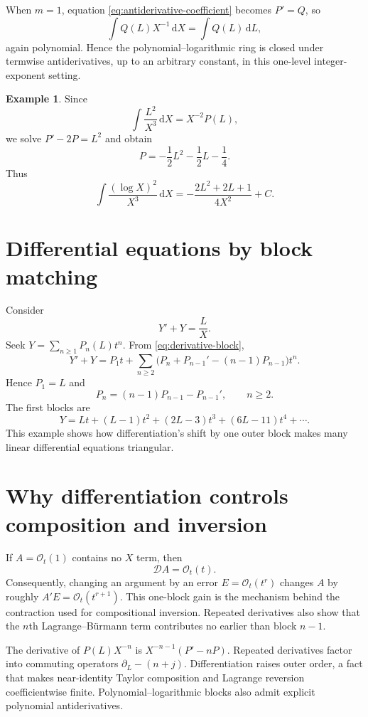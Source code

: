 \documentclass[11pt,oneside]{book}
\theoremstyle{definition}
\newtheorem{example}[theorem]{Example}
\theoremstyle{remark}
\newcommand{\dd}{\,\mathrm d}
\newcommand{\D}{\mathcal D}
\newcommand{\bigO}{\mathcal O}
\begin{document}
When $m=1$, equation \eqref{eq:antiderivative-coefficient} becomes $P'=Q$,
so
\[
 \int Q(L)X^{-1}\dd X=\int Q(L)\dd L,
\]
again polynomial.  Hence the polynomial--logarithmic ring is closed under
termwise antiderivatives, up to an arbitrary constant, in this one-level
integer-exponent setting.

\begin{example}
Since
\[
 \int \frac{L^2}{X^3}\dd X=X^{-2}P(L),
\]
we solve $P'-2P=L^2$ and obtain
\[
 P=-\frac12L^2-\frac12L-\frac14.
\]
Thus
\[
 \int \frac{(\log X)^2}{X^3}\dd X
 =-\frac{2L^2+2L+1}{4X^2}+C.
\]
\end{example}

\section{Differential equations by block matching}
Consider
\begin{equation}\label{eq:simple-ode}
 Y'+Y=\frac{L}{X}.
\end{equation}
Seek $Y=\sum_{n\ge1}P_n(L)t^n$.  From
\eqref{eq:derivative-block},
\[
 Y'+Y=P_1t+\sum_{n\ge2}
 \bigl(P_n+P_{n-1}'-(n-1)P_{n-1}\bigr)t^n.
\]
Hence $P_1=L$ and
\[
 P_n=(n-1)P_{n-1}-P_{n-1}',\qquad n\ge2.
\]
The first blocks are
\[
 Y=Lt+(L-1)t^2+(2L-3)t^3+(6L-11)t^4+\cdots.
\]
This example shows how differentiation's shift by one outer block makes many
linear differential equations triangular.

\section{Why differentiation controls composition and inversion}
If $A=\bigO_t(1)$ contains no $X$ term, then
\begin{equation}\label{eq:A-derivative-small}
 \D A=\bigO_t(t).
\end{equation}
Consequently, changing an argument by an error $E=\bigO_t(t^r)$ changes
$A$ by roughly $A'E=\bigO_t(t^{r+1})$.  This one-block gain is the mechanism
behind the contraction used for compositional inversion.  Repeated derivatives
also show that the $n$th Lagrange--B\"urmann term contributes no earlier than
block $n-1$.

\begin{summarybox}
The derivative of $P(L)X^{-n}$ is
$X^{-n-1}(P'-nP)$.  Repeated derivatives factor into commuting operators
$\partial_L-(n+j)$.  Differentiation raises outer order, a fact that makes
near-identity Taylor composition and Lagrange reversion coefficientwise
finite.  Polynomial--logarithmic blocks also admit explicit polynomial
antiderivatives.
\end{summarybox}
\end{document}
